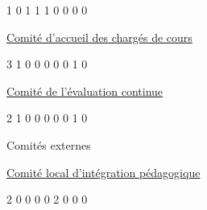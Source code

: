 \documentclass [12 pt]{article}
\begin{document}
                                
                            
                            1
                            0
                            1
                            1
                            1
                            0
                            0
                            0
                            0
                        
                        
                            
                                
        \href{
        https://wiki.umontreal.ca/pages/viewpage.action?pageId=124095459#cach
        } {
        Comité d'accueil des chargés de cours
        }
    
                            
                            3
                            1
                            0
                            0
                            0
                            0
                            0
                            1
                            0
                        
                        
                            
                                
        \href{
        https://wiki.umontreal.ca/pages/viewpage.action?pageId=124095459#ceco
        } {
        Comité de l'évaluation continue
        }
    
                            
                            2
                            1
                            0
                            0
                            0
                            0
                            0
                            1
                            0
                        
                        
                            Comités externes
                        
                        
                            
                                
        \href{
        https://wiki.umontreal.ca/pages/viewpage.action?pageId=124095459#clip
        } {
        Comité local d'intégration pédagogique
        }
    
                            
                            2
                            0
                            0
                            0
                            0
                            2
                            0
                            0
                            0
                        
\end{document}
